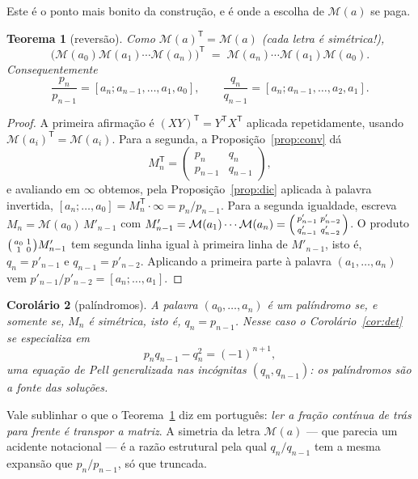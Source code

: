 \documentclass[11pt,a4paper]{article}
\theoremstyle{plain}
\newtheorem{teorema}{Teorema}[section]
\newtheorem{corolario}[teorema]{Corolário}
\theoremstyle{definition}
\theoremstyle{remark}
\newcommand{\Mat}[1]{\mathcal{M}(#1)}
\newcommand{\cf}[2]{[#1;#2]}
\begin{document}
Este é o ponto mais bonito da construção, e é onde a escolha de $\Mat{a}$ se paga.

\begin{teorema}[reversão]\label{thm:rev}
Como $\Mat{a}^{\mathsf T} = \Mat{a}$ (cada letra é simétrica!),
\[
  \big(\Mat{a_0}\Mat{a_1}\cdots\Mat{a_n}\big)^{\mathsf T}
  \;=\; \Mat{a_n}\cdots\Mat{a_1}\Mat{a_0}.
\]
Consequentemente
\[
  \frac{p_n}{p_{n-1}} = \cf{a_n}{a_{n-1},\dots,a_1,a_0},
  \qquad
  \frac{q_n}{q_{n-1}} = \cf{a_n}{a_{n-1},\dots,a_2,a_1}.
\]
\end{teorema}

\begin{proof}
A primeira afirmação é $(XY)^{\mathsf T} = Y^{\mathsf T}X^{\mathsf T}$ aplicada repetidamente,
usando $\Mat{a_i}^{\mathsf T}=\Mat{a_i}$. Para a segunda, a Proposição~\ref{prop:conv} dá
\[
  M_n^{\mathsf T} = \begin{pmatrix} p_n & q_n \\ p_{n-1} & q_{n-1}\end{pmatrix},
\]
e avaliando em $\infty$ obtemos, pela Proposição~\ref{prop:dic} aplicada à palavra invertida,
$\cf{a_n}{\dots,a_0} = M_n^{\mathsf T}\cdot\infty = p_n/p_{n-1}$.
Para a segunda igualdade, escreva $M_n = \Mat{a_0}\,M'_{n-1}$ com
$M'_{n-1}=\Mat{a_1}\cdots\Mat{a_n} = \begin{psmallmatrix}p'_{n-1}&p'_{n-2}\\ q'_{n-1}&q'_{n-2}\end{psmallmatrix}$.
O produto $\begin{psmallmatrix}a_0&1\\1&0\end{psmallmatrix}M'_{n-1}$ tem segunda linha igual à
primeira linha de $M'_{n-1}$, isto é, $q_n = p'_{n-1}$ e $q_{n-1}=p'_{n-2}$. Aplicando a
primeira parte à palavra $(a_1,\dots,a_n)$ vem $p'_{n-1}/p'_{n-2} = \cf{a_n}{\dots,a_1}$.
\end{proof}

\begin{corolario}[palíndromos]
A palavra $(a_0,\dots,a_n)$ é um palíndromo se, e somente se, $M_n$ é simétrica, isto é,
$q_n = p_{n-1}$. Nesse caso o Corolário~\ref{cor:det} se especializa em
\[
  p_nq_{n-1} - q_n^2 = (-1)^{n+1},
\]
uma equação de Pell generalizada nas incógnitas $(q_n,q_{n-1})$: os palíndromos são a fonte
das soluções.
\end{corolario}

Vale sublinhar o que o Teorema~\ref{thm:rev} diz em português: \emph{ler a fração contínua de
trás para frente é transpor a matriz}. A simetria da letra $\Mat{a}$ --- que parecia um acidente
notacional --- é a razão estrutural pela qual $q_n/q_{n-1}$ tem a mesma expansão que
$p_n/p_{n-1}$, só que truncada.
\end{document}
